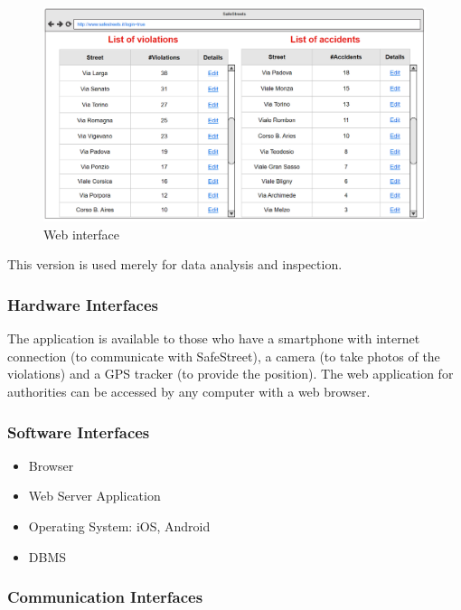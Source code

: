\begin{figure} [H]
\includegraphics[scale=0.5255]{Images/Templates/Authority/auth_4.PNG}
\caption{\label{fig:Mockup-8}Web interface}
\end{figure}

This version is used merely for data analysis and inspection.

\subsubsection{Hardware Interfaces}

The application is available to those who have a smartphone with internet connection (to communicate with SafeStreet), a camera (to take photos of the violations) and a GPS tracker (to provide the position).
The web application for authorities can be accessed by any computer with a web browser.

\subsubsection{Software Interfaces}

\begin{itemize}

\item Browser
\item Web Server Application
\item Operating System: iOS, Android
\item DBMS

\end{itemize} 

\subsubsection{Communication Interfaces}


